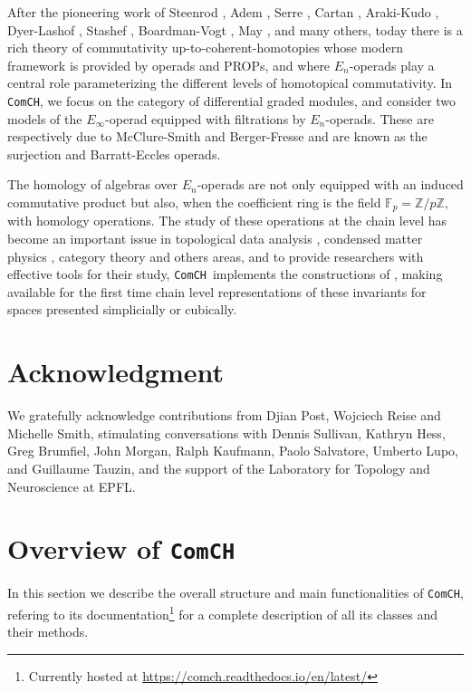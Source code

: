 \documentclass{amsart}
\newcommand{\comch}{\texttt{ComCH}}
\begin{document}
After the pioneering work of Steenrod \cite{Steenrod47, Steenrod62}, Adem \cite{Adem52}, Serre \cite{Serre53}, Cartan \cite{Cartan55}, Araki-Kudo \cite{ArakiKudo56}, Dyer-Lashof \cite{DyerLashof62}, Stashef \cite{Stasheff63}, Boardman-Vogt \cite{BoardmanVogt73}, May \cite{May70algebraic, May72geometry}, and many others, today there is a rich theory of commutativity up-to-coherent-homotopies whose modern framework is provided by operads and PROPs, and where $E_n$-operads play a central role parameterizing the different levels of homotopical commutativity. In \comch, we focus on the category of differential graded modules, and consider two models of the $E_\infty$-operad equipped with filtrations by $E_n$-operads. These are respectively due to McClure-Smith \cite{McClureSmith03} and Berger-Fresse \cite{BergerFresse04} and are known as the surjection and Barratt-Eccles operads.

The homology of algebras over $E_n$-operads are not only equipped with an induced commutative product but also, when the coefficient ring is the field $\mathbb F_p = \mathbb Z/ p\mathbb Z$, with homology operations. The study of these operations at the chain level has become an important issue in topological data analysis \cite{medina2018persistence}, condensed matter physics \cite{kapustin2017fermionic}, category theory \cite{medina2020globular} and others areas, and to provide researchers with effective tools for their study, \comch\, implements the constructions of \cite{medina2020chain}, making available for the first time chain level representations of these invariants for spaces presented simplicially or cubically.

\section*{Acknowledgment}
We gratefully acknowledge contributions from Djian Post, Wojciech Reise and Michelle Smith, stimulating conversations with Dennis Sullivan, Kathryn Hess, Greg Brumfiel, John Morgan, Ralph Kaufmann, Paolo Salvatore, Umberto Lupo, and Guillaume Tauzin, and the support of the Laboratory for Topology and Neuroscience at EPFL.

\section{Overview of \comch}

In this section we describe the overall structure and main functionalities of \comch, refering to its documentation\footnote{Currently hosted at \url{https://comch.readthedocs.io/en/latest/}} for a complete description of all its classes and their methods.
\end{document}
